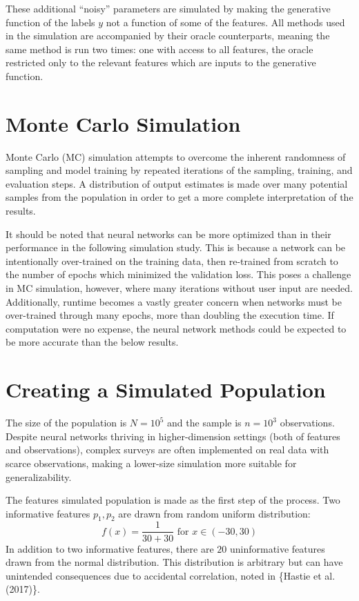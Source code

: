 \documentclass[12pt,twoside]{reedthesis}
\begin{document}
These additional ``noisy'' parameters are simulated by making the
generative function of the labels \(y\) not a function of some of the
features. All methods used in the simulation are accompanied by their
oracle counterparts, meaning the same method is run two times: one with
access to all features, the oracle restricted only to the relevant
features which are inputs to the generative function.

\section{Monte Carlo Simulation}\label{monte-carlo-simulation}

Monte Carlo (MC) simulation attempts to overcome the inherent randomness
of sampling and model training by repeated iterations of the sampling,
training, and evaluation steps. A distribution of output estimates is
made over many potential samples from the population in order to get a
more complete interpretation of the results.

It should be noted that neural networks can be more optimized than in
their performance in the following simulation study. This is because a
network can be intentionally over-trained on the training data, then
re-trained from scratch to the number of epochs which minimized the
validation loss. This poses a challenge in MC simulation, however, where
many iterations without user input are needed. Additionally, runtime
becomes a vastly greater concern when networks must be over-trained
through many epochs, more than doubling the execution time. If
computation were no expense, the neural network methods could be
expected to be more accurate than the below results.

\section{Creating a Simulated
Population}\label{creating-a-simulated-population}

The size of the population is \(N=10^5\) and the sample is \(n=10^3\)
observations. Despite neural networks thriving in higher-dimension
settings (both of features and observations), complex surveys are often
implemented on real data with scarce observations, making a lower-size
simulation more suitable for generalizability.

The features simulated population is made as the first step of the
process. Two informative features \(p_1, p_2\) are drawn from random
uniform distribution: \[
f(x) = \frac{1}{30+30} \text{ for } x \in (-30, 30)
\] In addition to two informative features, there are \(20\)
uninformative features drawn from the normal distribution. This
distribution is arbitrary but can have unintended consequences due to
accidental correlation, noted in \{Hastie et al. (2017)\}.
\end{document}
